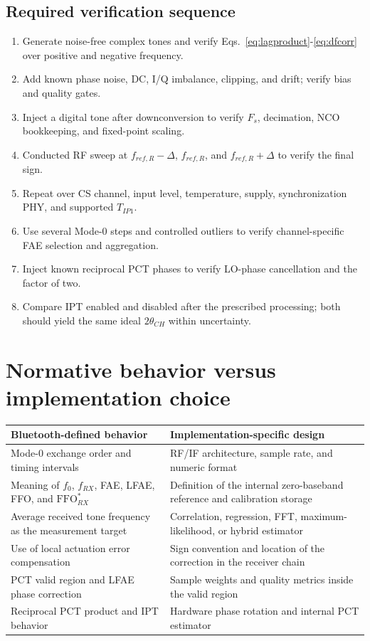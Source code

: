 \documentclass[10pt,a4paper]{article}
\newcommand{\FFO}{\mathrm{FFO}}
\begin{document}
\subsection{Required verification sequence}
\begin{enumerate}
\item Generate noise-free complex tones and verify Eqs.~\ref{eq:lagproduct}-\ref{eq:dfcorr} over positive and negative frequency.
\item Add known phase noise, DC, I/Q imbalance, clipping, and drift; verify bias and quality gates.
\item Inject a digital tone after downconversion to verify $F_s$, decimation, NCO bookkeeping, and fixed-point scaling.
\item Conducted RF sweep at $f_{ref,R}-\Delta$, $f_{ref,R}$, and $f_{ref,R}+\Delta$ to verify the final sign.
\item Repeat over CS channel, input level, temperature, supply, synchronization PHY, and supported $T_{IP1}$.
\item Use several Mode-0 steps and controlled outliers to verify channel-specific FAE selection and aggregation.
\item Inject known reciprocal PCT phases to verify LO-phase cancellation and the factor of two.
\item Compare IPT enabled and disabled after the prescribed processing; both should yield the same ideal $2\theta_{CH}$ within uncertainty.
\end{enumerate}

\section{Normative behavior versus implementation choice}
\begin{tabularx}{\linewidth}{@{}X X@{}}
\toprule Bluetooth-defined behavior & Implementation-specific design \\
\midrule
Mode-0 exchange order and timing intervals & RF/IF architecture, sample rate, and numeric format\\
Meaning of $f_0$, $f_{RX}$, FAE, LFAE, FFO, and $\FFO_{RX}^{*}$ & Definition of the internal zero-baseband reference and calibration storage\\
Average received tone frequency as the measurement target & Correlation, regression, FFT, maximum-likelihood, or hybrid estimator\\
Use of local actuation error compensation & Sign convention and location of the correction in the receiver chain\\
PCT valid region and LFAE phase correction & Sample weights and quality metrics inside the valid region\\
Reciprocal PCT product and IPT behavior & Hardware phase rotation and internal PCT estimator\\
\bottomrule
\end{tabularx}
\end{document}
